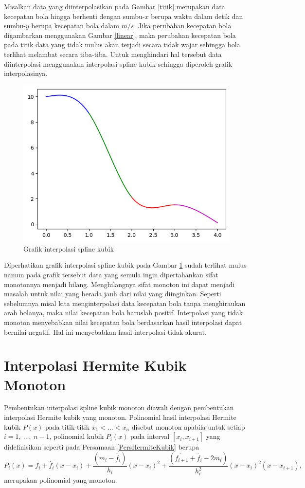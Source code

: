 Misalkan data yang diinterpolasikan pada Gambar \ref{titik} merupakan data kecepatan bola hingga berhenti dengan sumbu-$x$ berupa waktu dalam detik dan sumbu-$y$ berupa kecepatan bola dalam $m/s$. Jika perubahan kecepatan bola digambarkan menggunakan Gambar \ref{linear}, maka perubahan kecepatan bola pada titik data yang tidak mulus akan terjadi secara tidak wajar sehingga bola terlihat melambat secara tiba-tiba. Untuk menghindari hal tersebut data diinterpolasi menggunakan interpolasi spline kubik sehingga diperoleh grafik interpolasinya.
\begin{figure}[H]
    \centering
    \includegraphics{Images/splineKubik.png}
    \caption{Grafik interpolasi spline kubik}
    \label{grafikHermite}
\end{figure}

Diperhatikan grafik interpolasi spline kubik pada Gambar \ref{grafikHermite} sudah terlihat mulus namun pada grafik tersebut data yang semula ingin dipertahankan sifat monotonnya menjadi hilang. Menghilangnya sifat monoton ini dapat menjadi masalah untuk nilai yang berada jauh dari nilai yang diinginkan. Seperti sebelumnya misal kita menginterpolasi data kecepatan bola tanpa menghiraukan arah bolanya, maka nilai kecepatan bola haruslah positif. Interpolasi yang tidak monoton menyebabkan nilai kecepatan bola berdasarkan hasil interpolasi dapat bernilai negatif. Hal ini menyebabkan hasil interpolasi tidak akurat.

\section{Interpolasi Hermite Kubik Monoton}
Pembentukan interpolasi spline kubik monoton diawali dengan pembentukan interpolasi Hermite kubik yang monoton. Polinomial hasil interpolasi Hermite kubik $P(x)$ pada titik-titik $x_1<\dots<x_n$ disebut monoton apabila untuk setiap $i=1,\:\dots,\:n-1$, polinomial kubik $P_i(x)$ pada interval $[x_i,x_{i+1}]$ yang didefinisikan seperti pada Persamaan \eqref{PersHermiteKubik} berupa
\begin{equation}\label{P_i}
    P_i(x)=f_i + \dot{f_i}(x-x_i) + \frac{(m_i-\dot{f_i})}{h_i}(x-x_i)^2 + \frac{(\dot{f_{i+1}}+\dot{f_i}-2m_i)}{h_i^2}(x-x_i)^2(x-x_{i+1}),
\end{equation}
merupakan polinomial yang monoton. 



